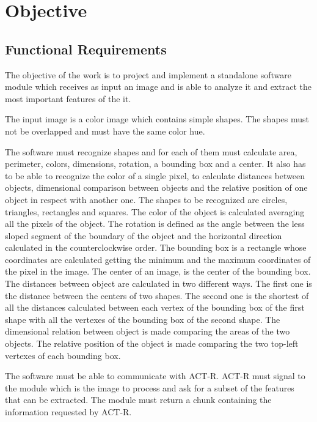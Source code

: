\chapter{Objective}


	\section{Functional Requirements}
	The objective of the work is to project and implement a standalone software module which receives as input an image and is able to analyze it and extract the most important features of the it.

	The input image is a color image which contains simple shapes. The shapes must not be overlapped and must have the same color hue.

	The software must recognize shapes and for each of them must calculate area, perimeter, colors, dimensions, rotation, a bounding box and a center. It also has to be able to recognize the color of a single pixel, to calculate distances between objects, dimensional comparison between objects and the relative position of one object in respect with another one.
	The shapes to be recognized are circles, triangles, rectangles and squares. 
	The color of the object is calculated averaging all the pixels of the object.
	The rotation is defined as the angle between the less sloped segment of the boundary of the object and the horizontal direction calculated in the counterclockwise order.
	The bounding box is a rectangle whose coordinates are calculated getting the minimum and the maximum coordinates of the pixel in the image. 
	The center of an image, is the center of the bounding box.
	The distances between object are calculated in two different ways. The first one is the distance between the centers of two shapes. The second one is the shortest of all the distances calculated between each vertex of the bounding box of the first shape with all the vertexes of the bounding box of the second shape.
	The dimensional relation between object is made comparing the areas of the two objects. 
	The relative position of the object is made comparing the two top-left vertexes of each bounding box.

	The software must be able to communicate with ACT-R. 
	ACT-R must signal to the module which is the image to process and ask for a subset of the features that can be extracted. The module must return a chunk containing the information requested by ACT-R.

